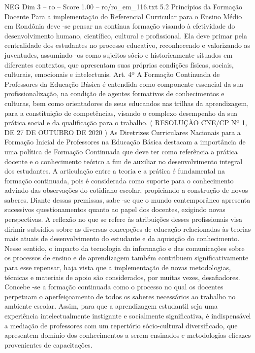\begin{textsample}{NEG Dim 3 – ro – Score 1.00 – ro/ro\_em\_116.txt}  \label{ex:f3_neg_154}
5.2 Princípios da Formação Docente Para a implementação do Referencial Curricular para o Ensino Médio em Rondônia deve -se pensar na contínua formação visando à efetividade do desenvolvimento humano, científico, cultural e profissional.
Ela deve primar pela centralidade dos estudantes no processo educativo, reconhecendo e valorizando as juventudes, assumindo -os como sujeitos sócio e historicamente situados em diferentes contextos, que apresentam suas próprias condições físicas, sociais, culturais, emocionais e intelectuais.
Art. 4º A Formação Continuada de Professores da Educação Básica é entendida como componente essencial da sua profissionalização, na condição de agentes formativos de conhecimentos e culturas, bem como orientadores de seus educandos nas trilhas da aprendizagem, para a constituição de competências, visando o complexo desempenho da sua prática social e da qualificação para o trabalho. ( RESOLUÇÃO CNE/CP Nº 1, DE 27 DE OUTUBRO DE 2020 ) As Diretrizes Curriculares Nacionais para a Formação Inicial de Professores na Educação Básica destacam a importância de uma política de Formação Continuada que deve ter como referência a prática docente e o conhecimento teórico a fim de auxiliar no desenvolvimento integral dos estudantes.
A articulação entre a teoria e a prática é fundamental na formação continuada, pois é considerada como suporte para o conhecimento advindo das observações do cotidiano escolar, propiciando a construção de novos saberes.
Diante dessas premissas, sabe -se que o mundo contemporâneo apresenta sucessivos questionamentos quanto ao papel dos docentes, exigindo novas perspectivas.
A reflexão no que se refere às atribuições desses profissionais visa dirimir subsídios sobre as diversas concepções de educação relacionadas às teorias mais atuais de desenvolvimento do estudante e da aquisição do conhecimento.
Nesse sentido, o impacto da tecnologia da informação e das comunicações sobre os processos de ensino e de aprendizagem também contribuem significativamente para esse repensar, haja vista que a implementação de novas metodologias, técnicas e materiais de apoio são considerados, por muitas vezes, desafiadores.
Concebe -se a formação continuada como o processo no qual os docentes perpetuam o aperfeiçoamento de todos os saberes necessários ao trabalho no ambiente escolar.
Assim, para que a aprendizagem estudantil seja uma experiência intelectualmente instigante e socialmente significativa, é indispensável a mediação de professores com um repertório sócio-cultural diversificado, que apresentem domínio dos conhecimentos a serem ensinados e metodologias eficazes provenientes de capacitações.

\end{textsample}

